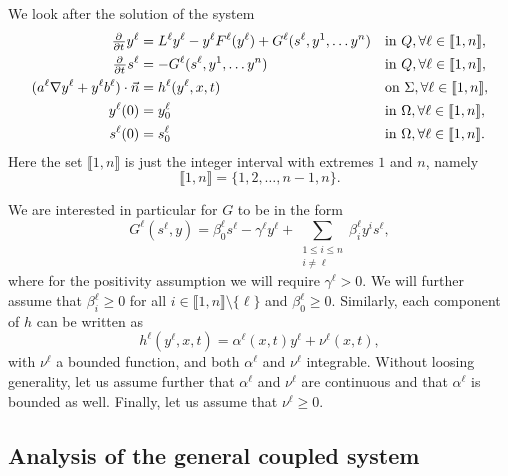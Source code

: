 \documentclass[11pt]{article}
\newcommand{\llb}{\llbracket}
\newcommand{\rrb}{\rrbracket}
\numberwithin{equation}{section}
\begin{document}
We look after the solution of the system
\begin{subequations}
\label{eq:pde-ode-sys-a}
\begin{align}
	\pd{ }{t} y^\ell &= L^\ell y^\ell - y^\ell F^\ell(y^\ell) + G^\ell(s^\ell,y^1,\ldots y^n) 		&& \text{in } Q, \forall \ell \in \llb 1,n\rrb,
	\\
	\label{sys:coupled-ode}
	\pd{ }{t} s^\ell &= -G^\ell(s^\ell,y^1,\ldots y^n)				&& \text{in } Q,\forall \ell \in \llb 1,n\rrb,
	\\
	 (a^\ell \nabla y^\ell + y^\ell b^\ell) \cdot \vec{n} &= h^\ell (y^\ell, x,t)	&& \text{on } \Sigma,\forall \ell \in \llb 1,n\rrb,
	 \label{eq:1.2.d}
	 \\
	 y^\ell(0) &= y^\ell_{0}			 && \text{in } \Omega, \forall \ell \in \llb 1,n\rrb,
	 \\
	 s^\ell(0) &= s^\ell_{0}			 && \text{in } \Omega, \forall \ell \in \llb 1,n\rrb.
\end{align}
\end{subequations}
Here the set \( \llb 1,n\rrb\) is just the integer interval with extremes \(1\) and \(n\), namely
\[
	\llb 1,n\rrb = \{1,2,\ldots, n-1, n\}.
\]

We are interested in particular for \(G\) to be in the form
\begin{equation}
\label{eq:form_of_G}
	G^\ell (s^\ell,y) = \beta_0^\ell s^\ell - \gamma^\ell y^\ell + \sum_{\substack{1\le i\le n\\ i\neq \ell}} \beta_i^\ell y^i s^\ell,
\end{equation}
where for the positivity assumption we will require \( \gamma^\ell > 0\). We will further assume that \(\beta_i^\ell \geq 0\) for all \(i \in \llb 1,n\rrb \setminus\{\ell\}\) and \(\beta_0^\ell \geq 0\). Similarly, each component of \(h\) can be written as
\begin{equation}
\label{eq:form_of_h}
	h^\ell(y^\ell,x,t) = \alpha^\ell (x,t) y^\ell + \nu^\ell (x,t),
\end{equation}
with \(\nu^\ell \) a bounded function, and both \(\alpha^\ell \) and \(\nu^\ell \) integrable. Without loosing generality, let us assume further that \(\alpha^\ell \) and \(\nu^\ell \) are continuous and that \(\alpha^\ell \) is bounded as well. Finally, let us assume that \( \nu^\ell \geq 0\).


\subsection{Analysis of the general coupled system}
\end{document}
